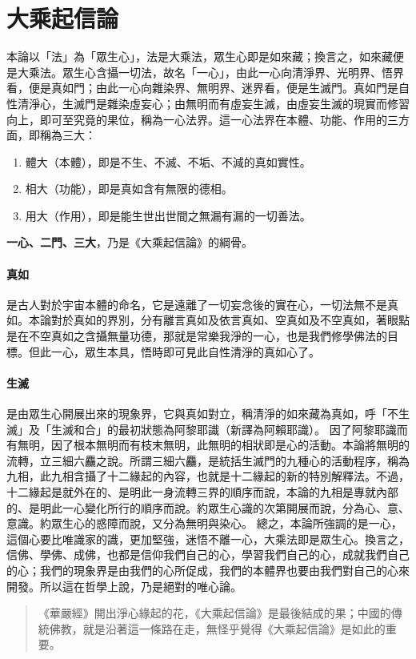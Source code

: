 \section{大乘起信論}
本論以「法」為「眾生心」，法是大乘法，眾生心即是如來藏；換言之，如來藏便是大乘法。眾生心含攝一切法，故名「一心」，由此一心向清淨界、光明界、悟界看，便是真如門；由此一心向雜染界、無明界、迷界看，便是生滅門。真如門是自性清淨心，生滅門是雜染虛妄心；由無明而有虛妄生滅，由虛妄生滅的現實而修習向上，即可至究竟的果位，稱為一心法界。這一心法界在本體、功能、作用的三方面，即稱為三大：
\begin{enumerate}
  \item 體大（本體），即是不生、不滅、不垢、不減的真如實性。
  \item 相大（功能），即是真如含有無限的德相。
  \item 用大（作用），即是能生世出世間之無漏有漏的一切善法。
\end{enumerate}
\textbf{一心、二門、三大}，乃是《大乘起信論》的綱骨。

\paragraph{真如}
是古人對於宇宙本體的命名，它是遠離了一切妄念後的實在心，一切法無不是真如。本論對於真如的界別，分有離言真如及依言真如、空真如及不空真如，著眼點是在不空真如之含攝無量功德，那就是常樂我淨的一心，也是我們修學佛法的目標。但此一心，眾生本具，悟時即可見此自性清淨的真如心了。

\paragraph{生滅}
是由眾生心開展出來的現象界，它與真如對立，稱清淨的如來藏為真如，呼「不生滅」及「生滅和合」的最初狀態為阿黎耶識（新譯為阿賴耶識）。
因了阿黎耶識而有無明，因了根本無明而有枝末無明，此無明的相狀即是心的活動。本論將無明的流轉，立三細六麤之說。所謂三細六麤，是統括生滅門的九種心的活動程序，稱為九相，此九相含攝了十二緣起的內容，也就是十二緣起的新的特別解釋法。不過，十二緣起是就外在的、是明此一身流轉三界的順序而說，本論的九相是專就內部的、是明此一心變化所行的順序而說。約眾生心識的次第開展而說，分為心、意、意識。約眾生心的惑障而說，又分為無明與染心。
總之，本論所強調的是一心，這個心要比唯識家的識，更加堅強，迷悟不離一心，大乘法即是眾生心。換言之，信佛、學佛、成佛，也都是信仰我們自己的心，學習我們自己的心，成就我們自己的心；我們的現象界是由我們的心所促成，我們的本體界也要由我們對自己的心來開發。所以這在哲學上說，乃是絕對的唯心論。

\begin{quote}
  《華嚴經》開出淨心緣起的花，《大乘起信論》是最後結成的果；中國的傳統佛教，就是沿著這一條路在走，無怪乎覺得《大乘起信論》是如此的重要。
\end{quote}
